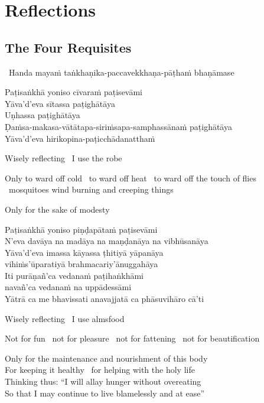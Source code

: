 \ifdesktopversion
{}
\else
{}
\fi

\chapter{Reflections}

\section{The Four Requisites}
\label{four-requisites}

\begin{leader}
  \anglebracketleft\ \hspace{-0.5mm}Handa mayaṁ taṅkhaṇika-paccavekkhaṇa-pāṭhaṁ bhaṇāmase \hspace{-0.5mm}\anglebracketright\
\end{leader}

Paṭisaṅkhā yoniso cīvaraṁ paṭisevāmi\\
Yāva'd'eva sītassa paṭighātāya\\
Uṇhassa paṭighātāya\\
Ḍaṁsa-makasa-vātātapa-siriṁsapa-samphassānaṁ paṭighātāya\\
Yāva'd'eva hirikopina-paṭicchādanatthaṁ

\begin{english-keepwith}
  Wisely reflecting \breathmark\ I use the robe
  \begin{english-hangtogether}
    Only to ward off cold \breathmark\ to ward off heat \breathmark\ to ward off the touch of flies \breathmark\ mosquitoes wind burning and creeping things
  \end{english-hangtogether}
  Only for the sake of modesty
\end{english-keepwith}

Paṭisaṅkhā yoniso piṇḍapātaṁ paṭisevāmi\\
N'eva davāya na madāya na maṇḍanāya na vibhūsanāya\\
Yāva'd'eva imassa kāyassa ṭhitiyā yāpanāya\\
vihiṁs'ūparatiyā brahmacariy'ānuggahāya\\
Iti purāṇañ'ca vedanaṁ paṭihaṅkhāmi\\
navañ'ca vedanaṁ na uppādessāmi\\
Yātrā ca me bhavissati anavajjatā ca phāsuvihāro cā'ti

\begin{english-keepwith}
  Wisely reflecting \breathmark\ I use almsfood
  \begin{english-hangtogether}
    Not for fun \breathmark\ not for pleasure \breathmark\ not for fattening \breathmark\ not for beautification
  \end{english-hangtogether}
  Only for the maintenance and nourishment of this body\\
  For keeping it healthy \breathmark\ for helping with the holy life\\
  Thinking thus: ``I will allay hunger without overeating\\
  So that I may continue to live blamelessly and at ease''
\end{english-keepwith}

